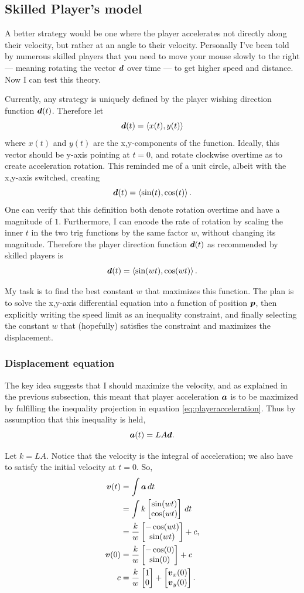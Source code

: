 \subsection{Skilled Player's model}
A better strategy would be one where the player accelerates not directly along their velocity, but rather at an angle to their velocity. Personally I've been told by numerous skilled players that you need to move your mouse slowly to the right --- meaning rotating the vector $\boldsymbol{d}$ over time --- to get higher speed and distance. Now I can test this theory.

Currently, any strategy is uniquely defined by the player wishing direction function $\boldsymbol{d}(t)$. Therefore let
\[
    \boldsymbol{d}(t) = \left\langle x(t), y(t) \right\rangle
\]
where $x(t)$ and $y(t)$ are the x,y-components of the function. Ideally, this vector should be y-axis pointing at $t=0$, and rotate clockwise overtime as to create acceleration rotation. This reminded me of a unit circle, albeit with the x,y-axis switched, creating
\[
    \boldsymbol{d}(t) = \left\langle \sin(t), \cos(t) \right\rangle.
\]
One can verify that this definition both denote rotation overtime and have a magnitude of $1$. Furthermore, I can encode the rate of rotation by scaling the inner $t$ in the two trig functions by the same factor $w$, without changing its magnitude. Therefore the player direction function $\boldsymbol{d}(t)$ as recommended by skilled players is
\[
    \boldsymbol{d}(t) = \left\langle \sin(wt), \cos(wt) \right\rangle.
\]

My task is to find the best constant $w$ that maximizes this function. The plan is to solve the x,y-axis differential equation into a function of position $\boldsymbol{p}$, then explicitly writing the speed limit as an inequality constraint, and finally selecting the constant $w$ that (hopefully) satisfies the constraint and maximizes the displacement.

\subsubsection{Displacement equation}
The key idea suggests that I should maximize the velocity, and as explained in the previous subsection, this meant that player acceleration $\boldsymbol{a}$ is to be maximized by fulfilling the inequality projection in equation \ref{eq:playeracceleration}. Thus by assumption that this inequality is held,
\[
    \boldsymbol{a}(t) = LA\boldsymbol{d}.
\]

Let $k=LA$. Notice that the velocity is the integral of acceleration; we also have to satisfy the initial velocity at $t=0$. So,
\begin{align*}
    \boldsymbol{v}(t) &= \int \boldsymbol{a} \, dt\\
    &= \int k \begin{bmatrix}\sin(wt)\\\cos(wt) \end{bmatrix} \, dt\\
    &= \frac{k}{w} \begin{bmatrix}-\cos(wt)\\\sin(wt) \end{bmatrix} + c,\\
    \boldsymbol{v}(0) &= \frac{k}{w} \begin{bmatrix}-\cos(0)\\\sin(0) \end{bmatrix} + c\\
    c &= \frac{k}{w} \begin{bmatrix}1\\0 \end{bmatrix} + \begin{bmatrix}\boldsymbol{v}_x(0)\\\boldsymbol{v}_y(0) \end{bmatrix}.
\end{align*}

